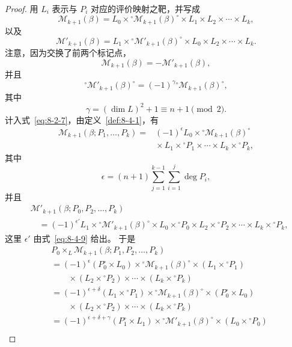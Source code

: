 \begin{proof}
用 $L_i$ 表示与 $P_i$ 对应的评价映射之靶，并写成
\[
 \mathcal M_{k+1}(\beta)
 =L_0\times{}^\circ\mathcal M_{k+1}(\beta)^\circ
  \times L_1\times L_2\times\cdots\times L_k,
\]
以及
\[
 \mathcal M'_{k+1}(\beta)
 =L_1\times{}^\circ\mathcal M'_{k+1}(\beta)^\circ
  \times L_0\times L_2\times\cdots\times L_k.
\]
注意，因为交换了前两个标记点，
\[
 \mathcal M_{k+1}(\beta)=-\mathcal M'_{k+1}(\beta),
\]
并且
\[
 {}^\circ\mathcal M'_{k+1}(\beta)^\circ
 =(-1)^\gamma{}^\circ\mathcal M_{k+1}(\beta)^\circ,
\]
其中
\[
 \gamma=(\dim L)^2+1\equiv n+1\pmod2.
\]
计入式~\eqref{eq:8-2-7}，由定义~\ref{def:8-4-1}，有
\[
\begin{aligned}
 \mathcal M_{k+1}(\beta;P_1,\ldots,P_k)
 ={}&(-1)^\epsilon L_0
 \times{}^\circ\mathcal M_{k+1}(\beta)^\circ\\[-2pt]
 &{}\times L_1\times{}^\circ P_1\times\cdots
 \times L_k\times{}^\circ P_k,
\end{aligned}
\]
其中
\[
 \epsilon=(n+1)
 \sum_{j=1}^{k-1}\sum_{i=1}^{j}\deg P_i,
\]
并且
\[
\begin{aligned}
 &\mathcal M'_{k+1}(\beta;P_0,P_2,\ldots,P_k)\\
 &\quad={}
 (-1)^{\epsilon'}L_1
 \times{}^\circ\mathcal M'_{k+1}(\beta)^\circ
 \times L_0\times{}^\circ P_0
 \times L_2\times{}^\circ P_2\times\cdots
 \times L_k\times{}^\circ P_k,
\end{aligned}
\]
这里 $\epsilon'$ 由式~\eqref{eq:8-4-9} 给出。%
于是
\[
\begin{aligned}
 &P_0\times_L\mathcal M_{k+1}(\beta;P_1,P_2,\ldots,P_k)\\
 &={}
 (-1)^\epsilon(P_0^\circ\times L_0)
 \times{}^\circ\mathcal M_{k+1}(\beta)^\circ
 \times(L_1\times{}^\circ P_1)\\[-2pt]
 &\qquad{}\times(L_2\times{}^\circ P_2)\times\cdots
 \times(L_k\times{}^\circ P_k)\\
 &=(-1)^{\epsilon+\delta}(L_1\times{}^\circ P_1)
 \times{}^\circ\mathcal M_{k+1}(\beta)^\circ
 \times(P_0^\circ\times L_0)\\[-2pt]
 &\qquad{}\times(L_2\times{}^\circ P_2)\times\cdots
 \times(L_k\times{}^\circ P_k)\\
 &=(-1)^{\epsilon+\delta+\gamma}(P_1^\circ\times L_1)
 \times{}^\circ\mathcal M'_{k+1}(\beta)^\circ
 \times(L_0\times{}^\circ P_0)\\[-2pt]

\end{aligned}\]
\end{proof}
